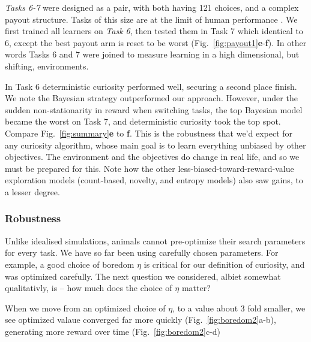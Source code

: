 \textit{Tasks 6-7} were designed as a pair, with both having 121 choices, and a complex payout structure. Tasks of this size are at the limit of human performance \citep{Wu2018}. We first trained all learners on \textit{Task 6}, then tested them in Task 7 which identical to 6, except the best payout arm is reset to be worst (Fig.~\ref{fig:payout1}\textbf{e}-\textbf{f}). In other words Tasks 6 and 7 were joined to measure learning in a high dimensional, but shifting, environments.

In Task 6 deterministic curiosity performed well, securing a second place finish. We note the Bayesian strategy  outperformed our approach. However, under the sudden non-stationarity in reward when switching tasks, the top Bayesian model became the worst on Task 7, and deterministic curiosity took the top spot. Compare Fig.~\ref{fig:summary}\textbf{e} to \textbf{f}. This is the robustness that we'd expect for any curiosity algorithm, whose main goal is to learn everything unbiased by other objectives. The environment and the objectives do change in real life, and so we must be prepared for this. Note how the other less-biased-toward-reward-value exploration models (count-based, novelty, and entropy models) also saw gains, to a lesser degree.

\subsubsection*{Robustness}
Unlike idealised simulations, animals cannot pre-optimize their search parameters for every task. We have so far been using carefully chosen parameters. For example, a good choice of boredom $\eta$ is critical for our definition of curiosity, and was optimized carefully. The next question we considered, albiet somewhat qualitativly, is -- how much does the choice of $\eta$ matter? 

When we move from an optimized choice of $\eta$, to a value about 3 fold smaller, we see optimized valaue converged far more quickly (Fig.~\ref{fig:boredom2}a-b), generating more reward over time (Fig.~\ref{fig:boredom2}c-d)


